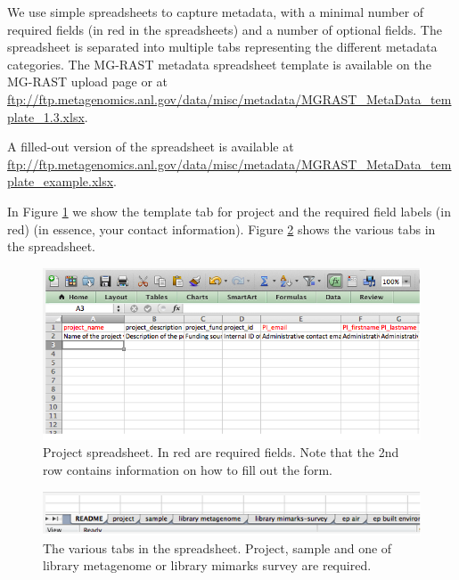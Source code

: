 \documentclass[12pt,fullpage]{report}
\begin{document}
We use simple spreadsheets to capture metadata, with a minimal number of required fields (in red in the spreadsheets) and a number of optional fields. The spreadsheet is separated into multiple tabs representing the different metadata categories. The MG-RAST metadata spreadsheet template is available on the MG-RAST upload page or at \url{ftp://ftp.metagenomics.anl.gov/data/misc/metadata/MGRAST_MetaData_template_1.3.xlsx}.

A filled-out version of the spreadsheet is available at \url{ftp://ftp.metagenomics.anl.gov/data/misc/metadata/MGRAST_MetaData_template_example.xlsx}.

In Figure \ref{fig:project-spreadsheet} we show the template tab for project and the required field labels (in red) (in essence, your contact information).
Figure \ref{fig:project-spreadsheet-multiple-tabs} shows the various tabs in the spreadsheet.

\begin{figure}[ht]
\begin{center}
\includegraphics[width=6in]{Images/project-spreadsheet.png}
\end{center}
\caption{
Project spreadsheet. In red are required fields. Note that the 2nd row contains information on how to fill out the form.
}
\label{fig:project-spreadsheet}
\end{figure}

\begin{figure}[ht]
\begin{center}
\includegraphics[width=6in]{Images/project-spreadsheet-multiple-tabs.png}
\end{center}
\caption{
The various tabs in the spreadsheet. Project, sample and one of library metagenome or library mimarks survey are required.
}
\label{fig:project-spreadsheet-multiple-tabs}
\end{figure}
\end{document}
